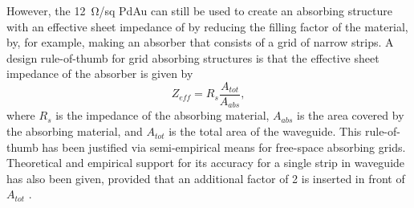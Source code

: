 However, the \SI{12}{\ohm}/sq PdAu can still be used to create an absorbing structure with an effective sheet impedance of  by reducing the filling factor of the material, by, for example, making an absorber that consists of a grid of narrow strips.
A design rule-of-thumb for grid absorbing structures is that the effective sheet impedance of the absorber is given by 
\begin{equation} \label{eqn:ch4-imp-fill-factor}
  Z_{eff} = R_s \frac{A_{tot}}{A_{abs}},
\end{equation}
where $R_s$ is the impedance of the absorbing material, $A_{abs}$ is the area covered by the absorbing material, and $A_{tot}$ is the total area of the waveguide.
This rule-of-thumb has been justified via semi-empirical means \cite{ulrich_far-infrared_1967,whitbourn_equivalent-circuit_1985} for free-space absorbing grids.
Theoretical and empirical support for its accuracy for a single strip in waveguide has also been given, provided that an additional factor of 2 is inserted in front of $A_{tot}$ \cite{datesman_analytical_2011}.

